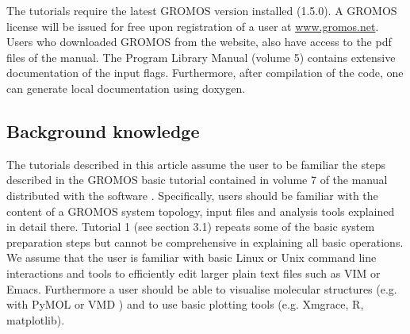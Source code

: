 The tutorials require the latest GROMOS version installed (1.5.0).
A GROMOS license will be issued for free upon registration of a user at \url{www.gromos.net}.  
Users who downloaded GROMOS from the website, also have access to the pdf files of the manual.
The Program Library Manual (volume 5) \cite{volume_5} 
contains extensive documentation of the input flags. Furthermore, after compilation of the code, one can generate local documentation using doxygen.

\subsection{Background knowledge}
%
The tutorials described in this article assume the user to be familiar the steps described in the GROMOS basic tutorial contained in volume 7 of the manual distributed with the software \cite{volume_7}. Specifically, users should be familiar
with the content of a GROMOS system topology, input files and analysis tools explained in detail there.
Tutorial 1 (see section 3.1) repeats some of the basic system preparation steps but cannot be comprehensive in explaining all basic operations. We assume that the user is familiar with basic Linux or Unix 
command line interactions and tools to efficiently edit larger plain text files such as VIM or Emacs. Furthermore a user should be able to visualise molecular structures (e.g. with PyMOL \cite{pymol} or VMD \cite{HUMP96}) 
and to use basic plotting tools (e.g. Xmgrace, R, matplotlib).  

